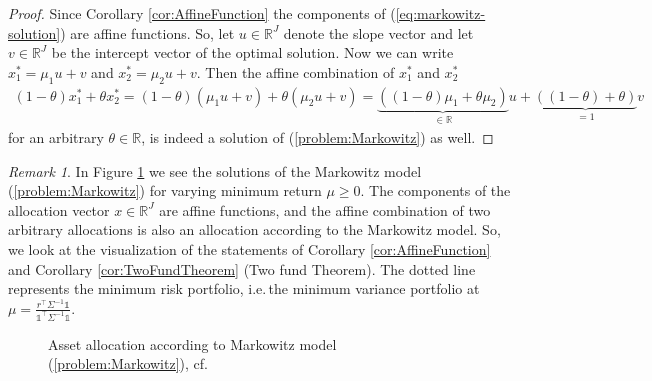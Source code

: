 \documentclass[a4paper, english, 11pt, onecolumn, oneside, final]{article}
\numberwithin{equation}{section}   %
\newcommand{\R}{\mathbb{R}}                 %
\newcommand{\one}{\mathds 1}
\newcommand{\B}{r^\top\Sigma^{-1}\one}
\newcommand{\C}{\one^\top\Sigma^{-1}\one}
\theoremstyle{plain}
\theoremstyle{definition}
\theoremstyle{remark}
\newtheorem{remark}     [theorem]{Remark}
\begin{document}
\begin{proof}
     Since Corollary \ref{cor:AffineFunction} the components of (\ref{eq:markowitz-solution}) are affine functions. So, let $u\in\R^J$ denote the slope vector and let $v\in\R^J$ be the intercept vector of the optimal solution. Now we can write $x_1^*=\mu_1u+v$ and $x_2^*=\mu_2u+v$. Then the affine combination of $x_1^*$ and $x_2^*$
    \begin{equation*}
        \begin{aligned}
            (1-\theta)x_1^* + \theta x_2^*
            = (1-\theta)(\mu_1u+v) + \theta(\mu_2u+v)
            = \underbrace{((1-\theta)\mu_1 + \theta\mu_2)}_{\in\R}u + \underbrace{((1-\theta)+\theta)}_{=1}v
        \end{aligned}
    \end{equation*}
    for an arbitrary $\theta\in\R$, is indeed a solution of (\ref{problem:Markowitz}) as well.
\end{proof}
\begin{remark}
    In Figure \ref{fig:AllocationMarkowitz} we see the solutions of the Markowitz model (\ref{problem:Markowitz}) for varying minimum return $\mu\geq0$. The components of the allocation vector $x\in\R^J$ are affine functions, and the affine combination of two arbitrary allocations is also an allocation according to the Markowitz model. So, we look at the visualization of the statements of Corollary \ref{cor:AffineFunction} and Corollary \ref{cor:TwoFundTheorem} (Two fund Theorem). The dotted line represents the minimum risk portfolio, i.e.\,the minimum variance portfolio at $\mu=\frac{\B}{\C}$.
\end{remark}
\begin{figure}[h]
  \centering
  
  \caption{Asset allocation according to Markowitz model (\ref{problem:Markowitz}), cf. \citet[p.~27]{PichlerPortfoliooptimierung}}
\label{fig:AllocationMarkowitz}
\end{figure}
\newpage
\end{document}
